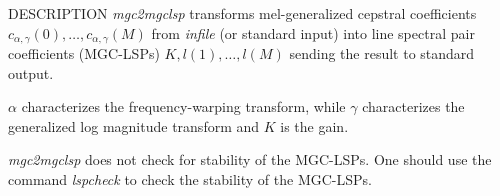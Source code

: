 \begin{synopsis}
\item [mgc2mgclsp] [ --a $A$] [ --g $G$ ] [ --m $M$ ] [ --o $O$ ]
 [ --s $S$ ] [ --k ] [ --L ] [ {\em infile} ]
\end{synopsis}

\begin{qsection}{DESCRIPTION}
{\em mgc2mgclsp} transforms mel-generalized cepstral coefficients
$c_{\alpha,\gamma}(0), \dots, c_{\alpha,\gamma}(M)$
from {\em infile} (or standard input)
into line spectral pair coefficients (MGC-LSPs) $K, l(1), \dots, l(M)$
sending the result to standard output.

$\alpha$ characterizes the frequency-warping transform,
while $\gamma$ characterizes the generalized log magnitude transform
and $K$ is the gain.

{\em mgc2mgclsp} does not check for stability of the MGC-LSPs.
One should use the command {\em lspcheck} to check the stability of the
MGC-LSPs.

\end{qsection}

\begin{options}
\end{options}

